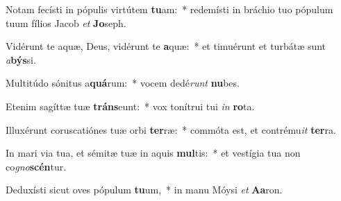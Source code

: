 \item Notam fecísti in pópulis virtútem \textbf{tu}am:~* redemísti in bráchio tuo pópulum tuum fílios Jacob \textit{et} \textbf{Jo}seph.
\item Vidérunt te aquæ, Deus, vidérunt te \textbf{a}quæ:~* et timuérunt et turbátæ sunt \textit{a}\textbf{býs}si.
\item Multitúdo sónitus a\textbf{quá}rum:~* vocem dedé\textit{runt} \textbf{nu}bes.
\item Etenim sagíttæ tuæ \textbf{tráns}eunt:~* vox tonítrui tui \textit{in} \textbf{ro}ta.
\item Illuxérunt coruscatiónes tuæ orbi \textbf{ter}ræ:~* commóta est, et contrému\textit{it} \textbf{ter}ra.
\item In mari via tua, et sémitæ tuæ in aquis \textbf{mul}tis:~* et vestígia tua non co\textit{gno}\textbf{scén}tur.
\item Deduxísti sicut oves pópulum \textbf{tu}um,~* in manu Móysi \textit{et} \textbf{A}\textbf{a}ron.
